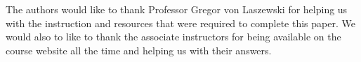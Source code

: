 \documentclass[sigconf]{acmart}
\begin{document}
\begin{acks}

The authors would like to thank Professor Gregor von Laszewski for helping us with the instruction and resources that were required to complete this paper. We would also to like to thank the associate instructors for being available on the course website all the time and helping us with their answers.

\end{acks}




 
\newpage
\appendix




\end{document}
